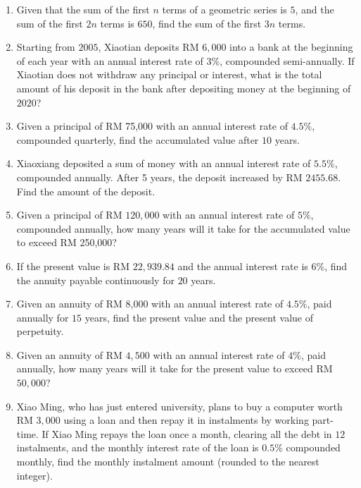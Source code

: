 \documentclass{report}
\begin{document}
\begin{enumerate}
            \item Given that the sum of the first \(n\) terms of a geometric series is $5$, and the sum of the first \(2n\) terms is $650$, find the sum of the first \(3n\) terms.
            
            \item Starting from $2005$, Xiaotian deposits RM $6,000$ into a bank at the beginning of each year with an annual interest rate of $3\%$, compounded semi-annually. If Xiaotian does not withdraw any principal or interest, what is the total amount of his deposit in the bank after depositing money at the beginning of $2020$?
            
            \item Given a principal of RM 75,000 with an annual interest rate of $4.5\%$, compounded quarterly, find the accumulated value after $10$ years.
            
            \item Xiaoxiang deposited a sum of money with an annual interest rate of $5.5\%$, compounded annually. After 5 years, the deposit increased by RM $2455.68$. Find the amount of the deposit.
            
            \item Given a principal of RM $120,000$ with an annual interest rate of $5\%$, compounded annually, how many years will it take for the accumulated value to exceed RM 250,000?
            
            \item If the present value is RM $22,939.84$ and the annual interest rate is $6\%$, find the annuity payable continuously for $20$ years.
            
            \item Given an annuity of RM 8,000 with an annual interest rate of $4.5\%$, paid annually for $15$ years, find the present value and the present value of perpetuity.
            
            \item Given an annuity of RM $4,500$ with an annual interest rate of $4\%$, paid annually, how many years will it take for the present value to exceed RM $50,000$?
            
            \item Xiao Ming, who has just entered university, plans to buy a computer worth RM $3,000$ using a loan and then repay it in instalments by working part-time. If Xiao Ming repays the loan once a month, clearing all the debt in $12$ instalments, and the monthly interest rate of the loan is $0.5\%$ compounded monthly, find the monthly instalment amount (rounded to the nearest integer).
            

\end{enumerate}
\end{document}
